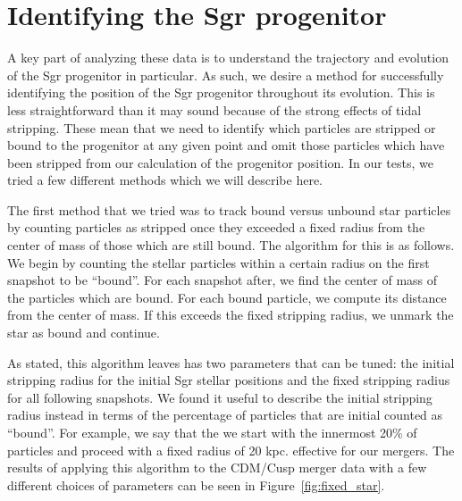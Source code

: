 \hypertarget{identifying-the-sgr-progenitor}{%
\section{Identifying the Sgr
progenitor}\label{identifying-the-sgr-progenitor}}

A key part of analyzing these data is to understand the trajectory and
evolution of the Sgr progenitor in particular. As such, we desire a
method for successfully identifying the position of the Sgr progenitor
throughout its evolution. This is less straightforward than it may sound
because of the strong effects of tidal stripping. These mean that we
need to identify which particles are stripped or bound to the progenitor
at any given point and omit those particles which have been stripped
from our calculation of the progenitor position. In our tests, we tried
a few different methods which we will describe here.

The first method that we tried was to track bound versus unbound star
particles by counting particles as stripped once they exceeded a fixed radius
from the center of mass of those which are still bound.  The algorithm for
this is as follows.  We begin by counting the stellar particles within a
certain radius on the first snapshot to be ``bound''.  For each snapshot
after, we find the center of mass of the particles which are bound.  For each
bound particle, we compute its distance from the center of mass.  If this
exceeds the fixed stripping radius, we unmark the star as bound and continue.

As stated, this algorithm leaves has two parameters that can be tuned: the
initial stripping radius for the initial Sgr stellar positions and the fixed
stripping radius for all following snapshots. We found it useful to describe the
initial stripping radius instead in terms of the percentage of particles
that are initial counted as ``bound''. For example, we say that the we start
with the innermost 20\% of particles and proceed with a fixed radius of 20 kpc. 
effective for our mergers. The results of applying this algorithm to the
CDM/Cusp merger data with a few different choices of parameters can be seen in
Figure~\ref{fig:fixed_star}.

